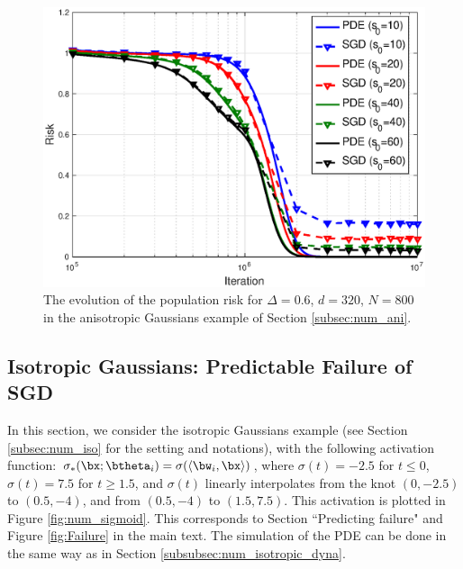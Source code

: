 \documentclass[11pt]{article}
\begin{document}
\begin{figure}[]
	\begin{center}
		\includegraphics[width=0.7\linewidth]{aniPDE_J400_d320_n800_Delta6.eps}
	\end{center}
	\caption{The evolution of the population risk for $\Delta=0.6$, $d=320$, $N=800$ in the anisotropic Gaussians example of Section \ref{subsec:num_ani}.}
	\label{fig:num_ani_risk_Delta6}
\end{figure}

\subsection{Isotropic Gaussians: Predictable Failure of SGD}\label{subsec:num_fail}
In this section, we consider the isotropic Gaussians example (see Section \ref{subsec:num_iso} for the setting and notations), with the following activation function: $\sigma_*(\bx;\btheta_i) = \sigma(\langle\bw_i,\bx\rangle)$, where $\sigma(t) = -2.5$ for $t\leq 0$, $\sigma(t) = 7.5$ for $t\geq 1.5$, and $\sigma(t)$ linearly interpolates from the knot $(0,-2.5)$ to $(0.5,-4)$, and from $(0.5,-4)$ to $(1.5,7.5)$. This activation is plotted in Figure \ref{fig:num_sigmoid}. This corresponds to Section ``Predicting failure" and Figure \ref{fig:Failure} in the main text. The simulation of the PDE can be done in the same way as in Section \ref{subsubsec:num_isotropic_dyna}.
\end{document}
